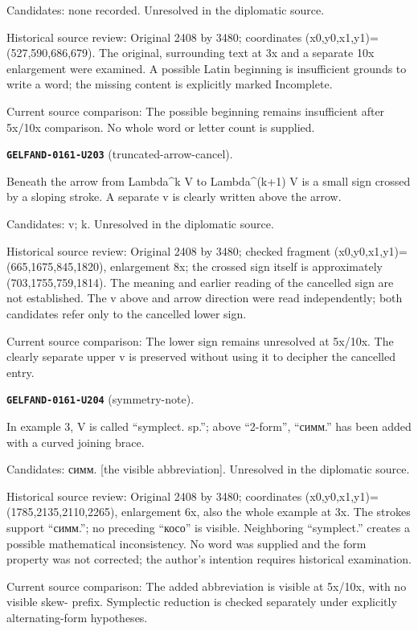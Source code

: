 Candidates: none recorded. Unresolved in the diplomatic source.\par
Historical source review: Original 2408 by 3480; coordinates (x0,y0,x1,y1)=(527,590,686,679). The original, surrounding text at 3x and a separate 10x enlargement were examined. A possible Latin beginning is insufficient grounds to write a word; the missing content is explicitly marked Incomplete.\par
Current source comparison: The possible beginning remains insufficient after 5x/10x comparison. No whole word or letter count is supplied.\par\medskip
\par\noindent\leavevmode{}\label{GELFAND-0161-U203}\label{GELFAND-P001489:truncated-arrow-cancel}\textbf{\texttt{GELFAND-0161-U203}} (truncated-arrow-cancel).\nopagebreak[4]\par
Beneath the arrow from Lambda\textasciicircum{}k V to Lambda\textasciicircum{}(k+1) V is a small sign crossed by a sloping stroke. A separate v is clearly written above the arrow.\par
Candidates: v; k. Unresolved in the diplomatic source.\par
Historical source review: Original 2408 by 3480; checked fragment (x0,y0,x1,y1)=(665,1675,845,1820), enlargement 8x; the crossed sign itself is approximately (703,1755,759,1814). The meaning and earlier reading of the cancelled sign are not established. The v above and arrow direction were read independently; both candidates refer only to the cancelled lower sign.\par
Current source comparison: The lower sign remains unresolved at 5x/10x. The clearly separate upper v is preserved without using it to decipher the cancelled entry.\par\medskip
\par\noindent\leavevmode{}\label{GELFAND-0161-U204}\label{GELFAND-P001489:symmetry-note}\textbf{\texttt{GELFAND-0161-U204}} (symmetry-note).\nopagebreak[4]\par
In example 3, V is called “symplect. sp.”; above “2-form”, “симм.” has been added with a curved joining brace.\par
Candidates: симм. [the visible abbreviation]. Unresolved in the diplomatic source.\par
Historical source review: Original 2408 by 3480; coordinates (x0,y0,x1,y1)=(1785,2135,2110,2265), enlargement 6x, also the whole example at 3x. The strokes support “симм.”; no preceding “косо” is visible. Neighboring “symplect.” creates a possible mathematical inconsistency. No word was supplied and the form property was not corrected; the author’s intention requires historical examination.\par
Current source comparison: The added abbreviation is visible at 5x/10x, with no visible skew- prefix. Symplectic reduction is checked separately under explicitly alternating-form hypotheses.\par\medskip
